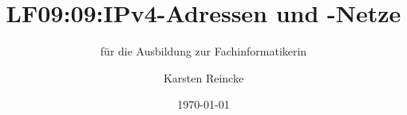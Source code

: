 \documentclass[]{beamer}
\title{LF09:09:IPv4-Adressen und -Netze}
\subtitle{für die Ausbildung zur Fachinformatikerin}
\institute[GS-LDK]{Gewerbliche Schulen Dillenburg}
\author{Karsten Reincke}
\date{\today}
\def\cfgGl{../../../cfg.gl/}
\begin{document}

\begin{frame}
  \titlepage

  
\end{frame}






\logo{}
\newpage



%
\end{document}
